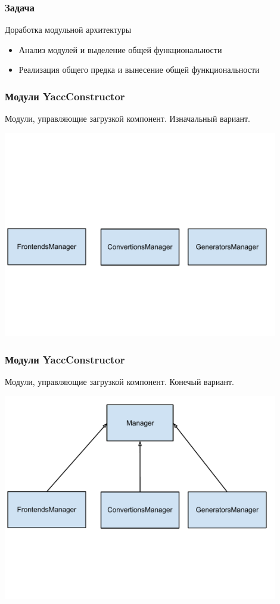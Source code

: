 \documentclass{beamer}
\begin{document}
\author[Дейкин Александр]{}

\begin{frame}
	\transwipe[direction=90]
	\frametitle{Задача}
	Доработка модульной архитектуры
	\begin{itemize}
        \item Анализ модулей и выделение общей функциональности
        \item Реализация общего предка и вынесение общей функциональности
    \end{itemize}
\end{frame}    

\begin{frame}
	\transwipe[direction=90]
	\frametitle{Модули  YaccConstructor}
	Модули, управляющие загрузкой компонент. Изначальный вариант.
	\begin{center}
        {\includegraphics[width= 0.9\textwidth, height=\textheight]{diagrams/YC_old_arch.pdf}}
    \end{center}
\end{frame}    

\begin{frame}
	\transwipe[direction=90]
	\frametitle{Модули YaccConstructor}
	Модули, управляющие загрузкой компонент. Конечый вариант.
	\begin{center}
        {\includegraphics[width= 0.9\textwidth, height=\textheight]{diagrams/YC_new_arch.pdf}}
    \end{center}
\end{frame}    
\end{document}

